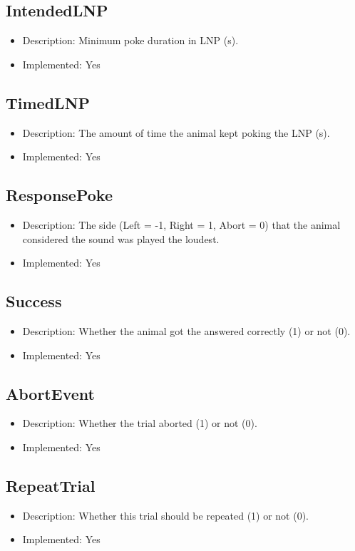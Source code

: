 \subsection*{IntendedLNP}
\begin{itemize}
	\item Description: Minimum poke duration in LNP (s).
	\item Implemented: Yes
\end{itemize}

\subsection*{TimedLNP}
\begin{itemize}
	\item Description: The amount of time the animal kept poking the LNP (s).
	\item Implemented: Yes
\end{itemize}

\subsection*{ResponsePoke}
\begin{itemize}
	\item Description: The side (Left = -1, Right = 1, Abort = 0) that the animal considered the sound was played the loudest.
	\item Implemented: Yes
\end{itemize}

\subsection*{Success}
\begin{itemize}
	\item Description: Whether the animal got the answered correctly (1) or not (0).
	\item Implemented: Yes
\end{itemize}

\subsection*{AbortEvent}
\begin{itemize}
	\item Description: Whether the trial aborted (1) or not (0).
	\item Implemented: Yes
\end{itemize}

\subsection*{RepeatTrial}
\begin{itemize}
	\item Description: Whether this trial should be repeated (1) or not (0).
	\item Implemented: Yes
\end{itemize}

